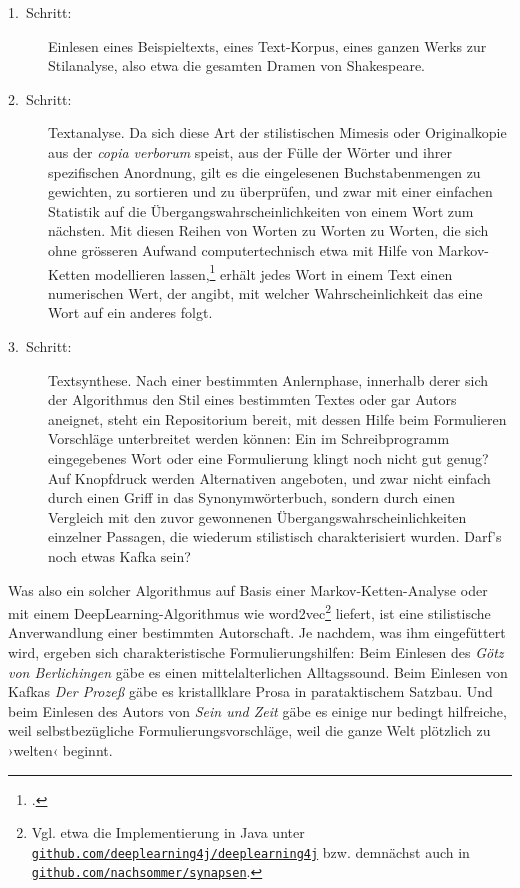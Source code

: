 \documentclass[a4paper,10pt]{article}
\newcommand{\inanf}[1]{›#1‹}
\begin{document}
\begin{description}
\item[1.~Schritt:] Einlesen eines Beispieltexts, eines Text-Korpus, eines ganzen Werks zur Stilanalyse, also etwa die gesamten Dramen von Shakespeare.
\item[2.~Schritt:] Textanalyse. Da sich diese Art der stilistischen Mimesis oder Originalkopie aus der \emph{copia verborum} speist, aus der Fülle der Wörter und ihrer spezifischen Anordnung, gilt es die eingelesenen Buchstabenmengen zu gewichten, zu sortieren und zu überprüfen, und zwar mit einer einfachen Statistik auf die Übergangswahrscheinlichkeiten von einem Wort zum nächsten. Mit diesen Reihen von Worten zu Worten zu Worten, die sich ohne grösseren Aufwand computertechnisch etwa mit Hilfe von Markov-Ketten modellieren lassen,\footcite[Zur Geschichte dieses Algorithmus vgl.][]{hilgers:2007} erhält jedes Wort in einem Text einen numerischen Wert, der angibt, mit welcher Wahrscheinlichkeit das eine Wort auf ein anderes folgt. 
\item[3.~Schritt:] Textsynthese. Nach einer bestimmten Anlernphase, innerhalb derer sich der Algorithmus den Stil eines bestimmten Textes oder gar Autors aneignet, steht ein Repositorium bereit, mit dessen Hilfe beim Formulieren Vorschläge unterbreitet werden können: Ein im Schreibprogramm eingegebenes Wort oder eine Formulierung klingt noch nicht gut genug? Auf Knopfdruck werden Alternativen angeboten, und zwar nicht einfach durch einen Griff in das Synonymwörterbuch, sondern durch einen Vergleich mit den zuvor gewonnenen Übergangswahrscheinlichkeiten einzelner Passagen, die wiederum stilistisch charakterisiert wurden. Darf's noch etwas Kafka sein? \end{description}
Was also ein solcher Algorithmus auf Basis einer Markov-Ketten-Analyse oder mit einem DeepLearning-Algorithmus wie word2vec\footnote{Vgl. etwa die Implementierung in Java unter \href{https://github.com/deeplearning4j/deeplearning4j}{\texttt{github.com/deeplearning4j/deeplearning4j}} bzw. demnächst auch in \href{https://github.com/nachsommer/synapsen}{\texttt{github.com/nachsommer/synapsen}}.} liefert, ist eine stilistische Anverwandlung einer bestimmten Autorschaft. Je nachdem, was ihm eingefüttert wird, ergeben sich charakteristische Formulierungshilfen: Beim Einlesen des \emph{Götz von Berlichingen} gäbe es einen mittelalterlichen Alltagssound. Beim Einlesen von Kafkas \emph{Der Prozeß} gäbe es kristallklare Prosa in parataktischem Satzbau. Und beim Einlesen des Autors von \emph{Sein und Zeit} gäbe es einige nur bedingt hilfreiche, weil selbstbezügliche Formulierungsvorschläge, weil die ganze Welt plötzlich zu \inanf{welten} beginnt.
\end{document}
